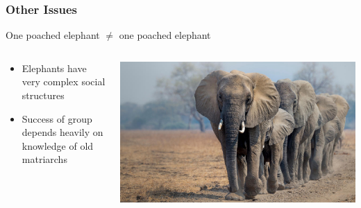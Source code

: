 \documentclass[10pt]{beamer}
\begin{document}
\begin{frame}[t]
\frametitle{Other Issues}
\vspace{0.5cm}
	
	One poached elephant $\neq$ one poached elephant\\
	
	\vspace{0.5cm}
	
	\begin{columns}
		\begin{column}{0.5\textwidth}
			\begin{itemize}
				\item Elephants have very complex social structures
				\medskip
				\item Success of group depends heavily on knowledge of old matriarchs
			\end{itemize}
		\end{column}
		
		\begin{column}{0.5\textwidth}
			\begin{center}
				\includegraphics[width=1.0\textwidth]{figures/matriarch.jpg}
			\end{center}
		\end{column}
	\end{columns}
\end{frame}
\end{document}
